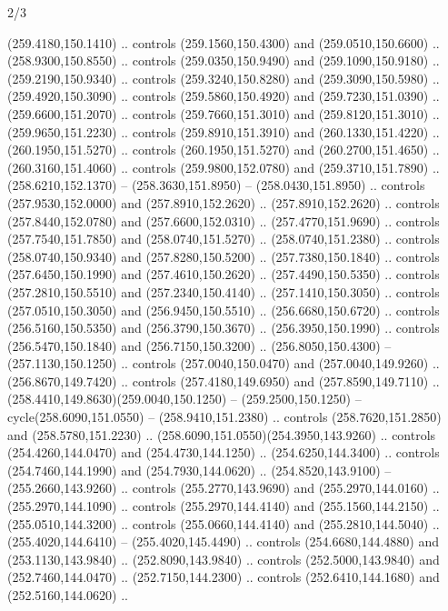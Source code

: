 \begin{flagdescription}{2/3}
\begin{scope}[xshift=0.5\flaglength,yshift=0.5\flagwidth,scale=\flagwidth/259.2]
\begin{scope}[y=0.8pt, x=0.8pt, yscale=-1,shift={(-243,-162)}]
      (259.4180,150.1410) .. controls (259.1560,150.4300) and (259.0510,150.6600) ..
      (258.9300,150.8550) .. controls (259.0350,150.9490) and (259.1090,150.9180) ..
      (259.2190,150.9340) .. controls (259.3240,150.8280) and (259.3090,150.5980) ..
      (259.4920,150.3090) .. controls (259.5860,150.4920) and (259.7230,151.0390) ..
      (259.6600,151.2070) .. controls (259.7660,151.3010) and (259.8120,151.3010) ..
      (259.9650,151.2230) .. controls (259.8910,151.3910) and (260.1330,151.4220) ..
      (260.1950,151.5270) .. controls (260.1950,151.5270) and (260.2700,151.4650) ..
      (260.3160,151.4060) .. controls (259.9800,152.0780) and (259.3710,151.7890) ..
      (258.6210,152.1370) -- (258.3630,151.8950) -- (258.0430,151.8950) .. controls
      (257.9530,152.0000) and (257.8910,152.2620) .. (257.8910,152.2620) .. controls
      (257.8440,152.0780) and (257.6600,152.0310) .. (257.4770,151.9690) .. controls
      (257.7540,151.7850) and (258.0740,151.5270) .. (258.0740,151.2380) .. controls
      (258.0740,150.9340) and (257.8280,150.5200) .. (257.7380,150.1840) .. controls
      (257.6450,150.1990) and (257.4610,150.2620) .. (257.4490,150.5350) .. controls
      (257.2810,150.5510) and (257.2340,150.4140) .. (257.1410,150.3050) .. controls
      (257.0510,150.3050) and (256.9450,150.5510) .. (256.6680,150.6720) .. controls
      (256.5160,150.5350) and (256.3790,150.3670) .. (256.3950,150.1990) .. controls
      (256.5470,150.1840) and (256.7150,150.3200) .. (256.8050,150.4300) --
      (257.1130,150.1250) .. controls (257.0040,150.0470) and (257.0040,149.9260) ..
      (256.8670,149.7420) .. controls (257.4180,149.6950) and (257.8590,149.7110) ..
      (258.4410,149.8630)(259.0040,150.1250) -- (259.2500,150.1250) --
      cycle(258.6090,151.0550) -- (258.9410,151.2380) .. controls
      (258.7620,151.2850) and (258.5780,151.2230) ..
      (258.6090,151.0550)(254.3950,143.9260) .. controls (254.4260,144.0470) and
      (254.4730,144.1250) .. (254.6250,144.3400) .. controls (254.7460,144.1990) and
      (254.7930,144.0620) .. (254.8520,143.9100) -- (255.2660,143.9260) .. controls
      (255.2770,143.9690) and (255.2970,144.0160) .. (255.2970,144.1090) .. controls
      (255.2970,144.4140) and (255.1560,144.2150) .. (255.0510,144.3200) .. controls
      (255.0660,144.4140) and (255.2810,144.5040) .. (255.4020,144.6410) --
      (255.4020,145.4490) .. controls (254.6680,144.4880) and (253.1130,143.9840) ..
      (252.8090,143.9840) .. controls (252.5000,143.9840) and (252.7460,144.0470) ..
      (252.7150,144.2300) .. controls (252.6410,144.1680) and (252.5160,144.0620) ..

\end{scope}
\end{scope}
\end{flagdescription}
